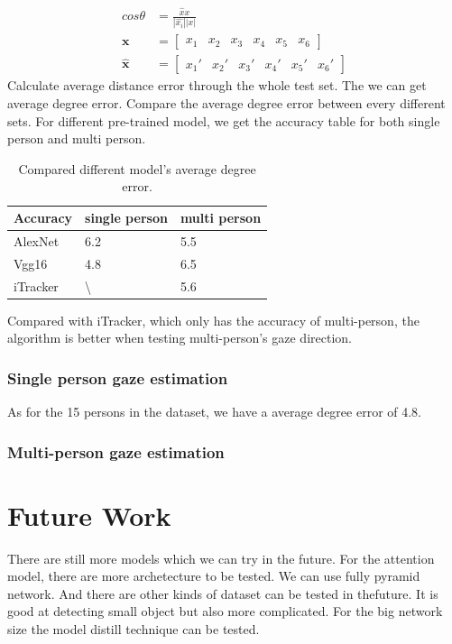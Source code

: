 \documentclass[senior]{IPSstyle}
\begin{document}
\begin{equation}\label{accuracy}
\begin{split}
    cos\theta        & = \frac{\hat{x}x}{|\hat{x_i}||x|} \\
    \boldsymbol{x}   & = \begin{bmatrix} x_1 &x_2 &x_3 & x_4 &x_5 &x_6 \end{bmatrix}  \\
    \hat{\boldsymbol{x}} & = \begin{bmatrix} {x_1}' &{x_2}' &{x_3}' & {x_4}' &{x_5}' &{x_6}' \end{bmatrix} 
\end{split}
\end{equation}
Calculate average distance error through the whole test set.
The we can get average degree error.
Compare the average degree error between every different sets.
For different pre-trained model, we get the accuracy table for both single person and multi person.
\begin{table}
\centering
\begin{tabular}{|l|l|l|}
\hline
Accuracy & single person & multi person \\ \hline
AlexNet & 6.2 & 5.5 \\ \hline
Vgg16 & 4.8 & 6.5 \\ \hline
iTracker & \textbackslash{} & 5.6 \\ \hline
\end{tabular}
\caption{Compared different model's average degree error.}
\label{my-label}
\end{table}
Compared with iTracker, which only has the accuracy of multi-person, the algorithm is better when testing multi-person's gaze direction.

\subsection{Single person gaze estimation}
As for the 15 persons in the dataset, we have a average degree error of 4.8.

\subsection{Multi-person gaze estimation}


\chapter{Future Work}\label{future work}
There are still more models which we can try in the future.
For the attention model, there are more archetecture to be tested.
We can use fully pyramid network\cite{lin2017feature}.
And there are other kinds of dataset can be tested in thefuture.
It is good at detecting small object but also more complicated.
For the big network size the model distill technique can be tested\cite{hinton2015distilling}.





\end{document}
